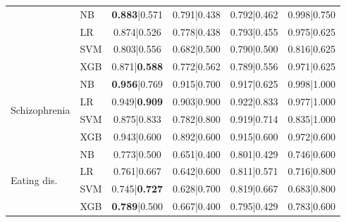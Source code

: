 \documentclass[11pt]{article}
\begin{document}
\begin{table}[t]
{\begin{tabular}{llcccc}
 & NB & \textbf{0.883}|0.571 & 0.791|0.438 & 0.792|0.462 & 0.998|0.750 \\
 & LR & 0.874|0.526 & 0.778|0.438 & 0.793|0.455 & 0.975|0.625 \\
 & SVM & 0.803|0.556 & 0.682|0.500 & 0.790|0.500 & 0.816|0.625 \\
 & XGB & 0.871|\textbf{0.588} & 0.772|0.562 & 0.789|0.556 & 0.971|0.625 \\
\midrule
\multirow{4}{*}{Schizophrenia}
 & NB & \textbf{0.956}|0.769 & 0.915|0.700 & 0.917|0.625 & 0.998|1.000 \\
 & LR & 0.949|\textbf{0.909} & 0.903|0.900 & 0.922|0.833 & 0.977|1.000 \\
 & SVM & 0.875|0.833 & 0.782|0.800 & 0.919|0.714 & 0.835|1.000 \\
 & XGB & 0.943|0.600 & 0.892|0.600 & 0.915|0.600 & 0.972|0.600 \\
\midrule
\multirow{4}{*}{Eating dis.}
 & NB & 0.773|0.500 & 0.651|0.400 & 0.801|0.429 & 0.746|0.600 \\
 & LR & 0.761|0.667 & 0.642|0.600 & 0.811|0.571 & 0.716|0.800 \\
 & SVM & 0.745|\textbf{0.727} & 0.628|0.700 & 0.819|0.667 & 0.683|0.800 \\
 & XGB & \textbf{0.789}|0.500 & 0.667|0.400 & 0.795|0.429 & 0.783|0.600 \\
\bottomrule
\end{tabular}%
}
\end{table}
\end{document}

